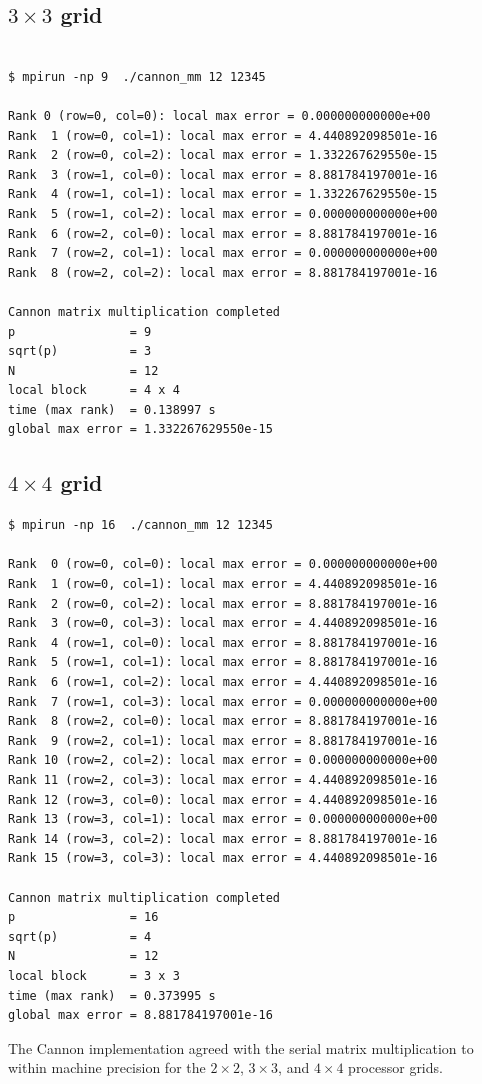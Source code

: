 \documentclass{article}[12pt]
\begin{document}
\subsection{$3 \times 3$ grid}

\begin{verbatim}

$ mpirun -np 9  ./cannon_mm 12 12345

Rank 0 (row=0, col=0): local max error = 0.000000000000e+00
Rank  1 (row=0, col=1): local max error = 4.440892098501e-16
Rank  2 (row=0, col=2): local max error = 1.332267629550e-15
Rank  3 (row=1, col=0): local max error = 8.881784197001e-16
Rank  4 (row=1, col=1): local max error = 1.332267629550e-15
Rank  5 (row=1, col=2): local max error = 0.000000000000e+00
Rank  6 (row=2, col=0): local max error = 8.881784197001e-16
Rank  7 (row=2, col=1): local max error = 0.000000000000e+00
Rank  8 (row=2, col=2): local max error = 8.881784197001e-16

Cannon matrix multiplication completed
p                = 9
sqrt(p)          = 3
N                = 12
local block      = 4 x 4
time (max rank)  = 0.138997 s
global max error = 1.332267629550e-15
\end{verbatim}
\subsection{$4 \times 4$ grid}

\begin{verbatim}
$ mpirun -np 16  ./cannon_mm 12 12345

Rank  0 (row=0, col=0): local max error = 0.000000000000e+00
Rank  1 (row=0, col=1): local max error = 4.440892098501e-16
Rank  2 (row=0, col=2): local max error = 8.881784197001e-16
Rank  3 (row=0, col=3): local max error = 4.440892098501e-16
Rank  4 (row=1, col=0): local max error = 8.881784197001e-16
Rank  5 (row=1, col=1): local max error = 8.881784197001e-16
Rank  6 (row=1, col=2): local max error = 4.440892098501e-16
Rank  7 (row=1, col=3): local max error = 0.000000000000e+00
Rank  8 (row=2, col=0): local max error = 8.881784197001e-16
Rank  9 (row=2, col=1): local max error = 8.881784197001e-16
Rank 10 (row=2, col=2): local max error = 0.000000000000e+00
Rank 11 (row=2, col=3): local max error = 4.440892098501e-16
Rank 12 (row=3, col=0): local max error = 4.440892098501e-16
Rank 13 (row=3, col=1): local max error = 0.000000000000e+00
Rank 14 (row=3, col=2): local max error = 8.881784197001e-16
Rank 15 (row=3, col=3): local max error = 4.440892098501e-16

Cannon matrix multiplication completed
p                = 16
sqrt(p)          = 4
N                = 12
local block      = 3 x 3
time (max rank)  = 0.373995 s
global max error = 8.881784197001e-16
\end{verbatim}

The Cannon implementation agreed with the serial matrix multiplication to within machine precision for the $2\times2$, $3\times3$, and $4\times4$ processor grids.
\end{document}
